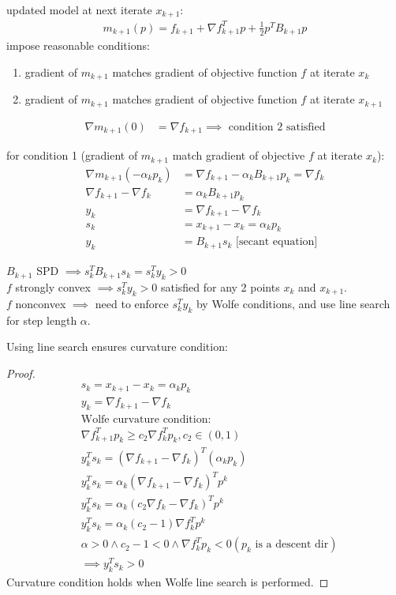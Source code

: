 \documentclass[8pt,letter]{article}
\begin{document}
\begin{multicols*}{2}
  updated model at next iterate $x_{k+1}$:
  \begin{align*}
    m_{k+1}(p)=f_{k+1} + \nabla f_{k+1}^T p + \frac{1}{2} p^T B_{k+1} p
  \end{align*}
  impose reasonable conditions:
  \begin{enumerate}
  \item gradient of $m_{k+1}$ matches gradient of objective function $f$ at iterate $x_k$
  \item gradient of $m_{k+1}$ matches gradient of objective function $f$ at iterate $x_{k+1}$
  \end{enumerate}
  \begin{align*}
    \nabla m_{k+1}(0) & = \nabla f_{k+1} \implies \text{ condition 2 satisfied}
  \end{align*}

  for condition 1 (gradient of $m_{k+1}$ match gradient of objective $f$ at iterate $x_k$):
  \begin{align*}
    \nabla m_{k+1}(-\alpha_k p_k) &= \nabla f_{k+1} - \alpha_k B_{k+1} p_k = \nabla f_k\\
    \nabla f_{k+1} - \nabla f_k &= \alpha_k B_{k+1} p_k\\
    y_k &= \nabla f_{k+1} - \nabla f_k\\
    s_k &= x_{k+1} - x_k = \alpha_k p_k\\
    y_k &= B_{k+1} s_k \text{ [secant equation]}
  \end{align*}

  $B_{k+1}$ SPD $\implies s_k^T B_{k+1} s_k = s_k^T y_k > 0$\\
  $f$ strongly convex $\implies s_k^T y_k > 0$ satisfied for any 2 points $x_k$ and $x_{k+1}$.\\
  $f$ nonconvex $\implies$ need to enforce $s_k^T y_k$ by Wolfe conditions, and use line search for step length $\alpha$.
  
  Using line search ensures curvature condition:
  \begin{proof}
    \begin{align*}
      &s_k=x_{k+1} - x_k = \alpha_k p_k\\
      &y_k = \nabla f_{k+1} - \nabla f_k\\
      &\text{Wolfe curvature condition:}\\
      &\nabla f_{k+1}^T p_k \geq c_2 \nabla f_k^T p_k, c_2 \in (0,1)\\
      &y_k^T s_k = (\nabla f_{k+1} - \nabla f_k)^T (\alpha_k p_k)\\
      &y_k^T s_k = \alpha_k (\nabla f_{k+1} - \nabla f_k)^T p^k\\
      &y_k^T s_k = \alpha_k (c_2 \nabla f_k - \nabla f_k)^T p^k\\
      &y_k^T s_k = \alpha_k (c_2-1) \nabla f_k^T p^k\\
      &\alpha > 0 \wedge c_2-1 < 0 \wedge \nabla f_k^T p_k < 0 (p_k \text{ is a descent dir})\\
      &\implies y_k^T s_k > 0
    \end{align*}
    Curvature condition holds when Wolfe line search is performed.
  \end{proof}


\end{multicols*}
\end{document}
